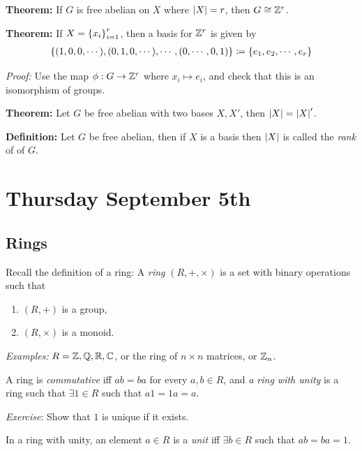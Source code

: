 \textbf{Theorem:} If \(G\) is free abelian on \(X\) where
\({\left\lvert {X} \right\rvert} = r\), then \(G \cong {\mathbb{Z}}^r\).

\textbf{Theorem:} If \(X = \left\{{x_i}\right\}_{i=1}^r\), then a basis for
\({\mathbb{Z}}^r\) is given by
\begin{align*}
\left\{{(1, 0, 0, \cdots), (0, 1, 0, \cdots), \cdots, (0, \cdots, 0, 1)}\right\} \coloneqq \left\{{e_1, e_2, \cdots, e_r}\right\}
\end{align*}

\emph{Proof:} Use the map \(\phi: G \to {\mathbb{Z}}^r\) where
\(x_i \mapsto e_i\), and check that this is an isomorphism of groups.

\textbf{Theorem:} Let \(G\) be free abelian with two bases \(X, X'\),
then \({\left\lvert {X} \right\rvert} = {\left\lvert {X} \right\rvert}'\).

\textbf{Definition:} Let \(G\) be free abelian, then if \(X\) is a basis
then \({\left\lvert {X} \right\rvert}\) is called the \emph{rank} of of \(G\).

\hypertarget{thursday-september-5th}{%
\section{Thursday September 5th}\label{thursday-september-5th}}

\hypertarget{rings}{%
\subsection{Rings}\label{rings}}

Recall the definition of a ring: A \emph{ring} \((R, +, \times)\) is a
set with binary operations such that

\begin{enumerate}
\def\labelenumi{\arabic{enumi}.}
\tightlist
\item
  \((R, +)\) is a group,
\item
  \((R, \times)\) is a monoid.
\end{enumerate}

\emph{Examples:} \(R = {\mathbb{Z}}, {\mathbb{Q}}, {\mathbb{R}}, {\mathbb{C}}\), or the ring of
\(n\times n\) matrices, or \({\mathbb{Z}}_n\).

A ring is \emph{commutative} iff \(ab = ba\) for every \(a,b\in R\), and
\emph{a ring with unity} is a ring such that \(\exists 1 \in R\) such
that \(a1 = 1a = a\).

\emph{Exercise}: Show that \(1\) is unique if it exists.

In a ring with unity, an element \(a\in R\) is a \emph{unit} iff
\(\exists b\in R\) such that \(ab = ba = 1\).

